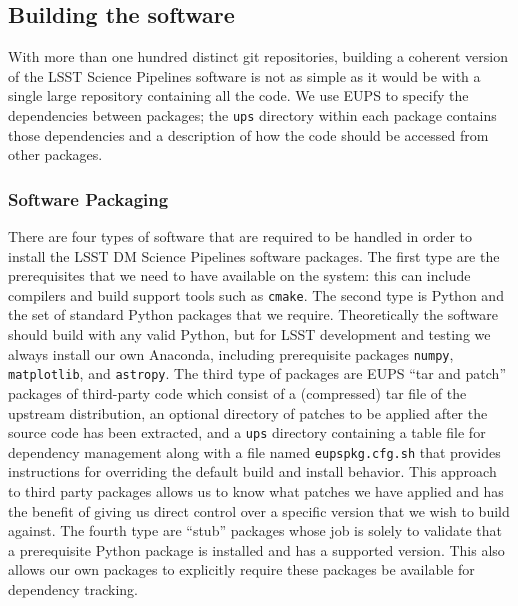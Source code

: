 \subsection{Building the software}
\label{sec:buildsw}

With more than one hundred distinct git repositories, building a coherent version of the LSST Science Pipelines software is not as simple as it would be with a single large repository containing all the code.
We use EUPS to specify the dependencies between packages; the \texttt{ups} directory within each package contains those dependencies and a description of how the code should be accessed from other packages.

\subsubsection{Software Packaging}
\label{sec:sw-packaging}

There are four types of software that are required to be handled in order to install the LSST DM Science Pipelines software packages.
The first type are the prerequisites that we need to have available on the system: this can include compilers and build support tools such as \texttt{cmake}.
The second type is Python and the set of standard Python packages that we require.
Theoretically the software should  build with any valid Python, but for LSST development and testing we always install our own Anaconda, including prerequisite packages \texttt{numpy},\cite{numpy} \texttt{matplotlib},\cite{doi:10.1109/MCSE.2007.55} and \texttt{astropy}\cite{2018arXiv180102634T}.
The third type of packages are EUPS ``tar and patch'' packages of third-party code
which  consist of a (compressed) tar file of the upstream distribution, an optional directory of patches to be applied after the source code has been extracted, and a \texttt{ups} directory containing a table file for dependency management along with a file named \texttt{eupspkg.cfg.sh} that provides instructions for overriding the default build and install behavior.
This approach to third party packages allows us to know what patches we have applied and has the benefit of giving us direct control over a specific version that we wish to build against.
The fourth type are ``stub'' packages whose job is solely to validate that a prerequisite Python package is installed and has a supported version.
This also allows our own packages to explicitly require these packages be available for dependency tracking.

